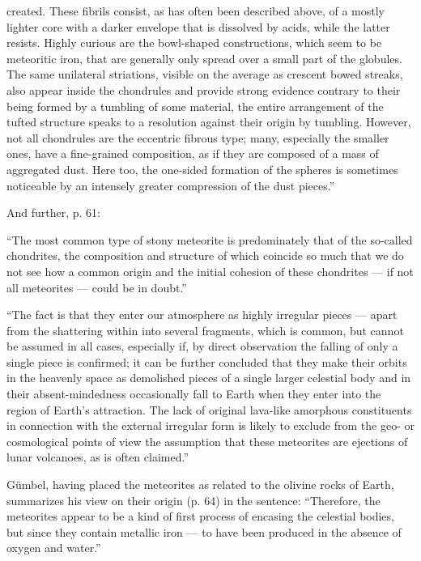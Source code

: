 \documentclass[a4paper, 12pt, oneside]{article}
\begin{document}
created. These fibrils consist, as has often been described above, of a mostly lighter core with a darker envelope that is dissolved by acids, while the latter resists. Highly curious are the bowl-shaped constructions, which seem to be meteoritic iron, that are generally only spread over a small part of the globules. The same unilateral striations, visible on the average as crescent bowed streaks, also appear inside the chondrules and provide strong evidence contrary to their being formed by a tumbling of some material, the entire arrangement of the tufted structure speaks to a resolution against their origin by tumbling. However, not all chondrules are the eccentric fibrous type; many, especially the smaller ones, have a fine-grained composition, as if they are composed of a mass of aggregated dust. Here too, the one-sided formation of the spheres is sometimes noticeable by an intensely greater compression of the dust pieces.''

And further, p. 61:

``The most common type of stony meteorite is predominately that of the so-called chondrites, the composition and structure of which coincide so much that we do not see how a common origin and the initial cohesion of these chondrites --- if not all meteorites --- could be in doubt.''

``The fact is that they enter our atmosphere as highly irregular pieces --- apart from the shattering within into several fragments, which is common, but cannot be assumed in all cases, especially if, by direct observation the falling of only a single piece is confirmed; it can be further concluded that they make their orbits in the heavenly space as demolished pieces of a single larger celestial body and in their absent-mindedness occasionally fall to Earth when they enter into the region of Earth's attraction. The lack of original lava-like amorphous constituents in connection with the external irregular form is likely to exclude from the geo- or cosmological points of view the assumption that these meteorites are ejections of lunar volcanoes, as is often claimed.''

Gümbel, having placed the meteorites as related to the olivine rocks of Earth, summarizes his view on their origin (p. 64) in the sentence: ``Therefore, the meteorites appear to be a kind of first process of encasing the celestial bodies, but since they contain metallic iron --- to have been produced in the absence of oxygen and water.''
\end{document}

